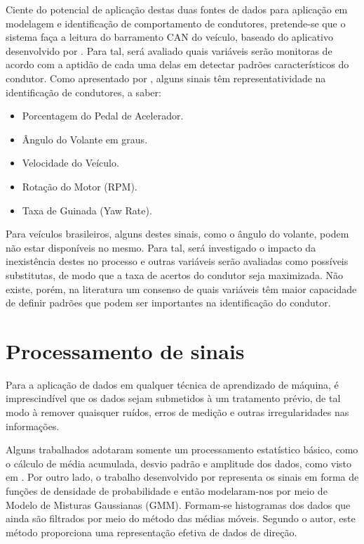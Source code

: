 Ciente do potencial de aplicação destas duas fontes de dados para aplicação em modelagem e identificação de comportamento de condutores, pretende-se que o sistema faça a leitura do barramento CAN do veículo, baseado do aplicativo desenvolvido por . Para tal, será avaliado quais variáveis serão monitoras de acordo com a aptidão de cada uma delas em detectar padrões característicos do condutor. Como apresentado por , alguns sinais têm representatividade na identificação de condutores, a saber:

\begin{itemize}
    \item Porcentagem do Pedal de Acelerador.
    
    \item Ângulo do Volante em graus.
    
    \item Velocidade do Veículo.
    
    \item Rotação do Motor (RPM).
    
    \item Taxa de Guinada (Yaw Rate).
    
\end{itemize}

Para veículos brasileiros, alguns destes sinais, como o ângulo do volante, podem não estar disponíveis no mesmo. Para tal, será investigado o impacto da inexistência destes no processo e outras variáveis serão avaliadas como possíveis substitutas, de modo que a taxa de acertos do condutor seja maximizada. Não existe, porém, na literatura um consenso de quais variáveis têm maior capacidade de definir padrões que podem ser importantes na identificação do condutor.

\section{Processamento de sinais}

Para a aplicação de dados em qualquer técnica de aprendizado de máquina, é imprescindível que os dados sejam submetidos à um tratamento prévio, de tal modo à remover quaisquer ruídos, erros de medição e outras irregularidades nas informações.

Alguns trabalhados adotaram somente um processamento estatístico básico, como o cálculo de média acumulada, desvio padrão e amplitude dos dados, como visto em . Por outro lado, o trabalho desenvolvido por  representa os sinais em forma de funções de densidade de probabilidade e então modelaram-nos por meio de Modelo de Misturas Gaussianas (GMM). Formam-se histogramas dos dados que ainda são filtrados por meio do método das médias móveis. Segundo o autor, este método proporciona uma representação efetiva de dados de direção.

